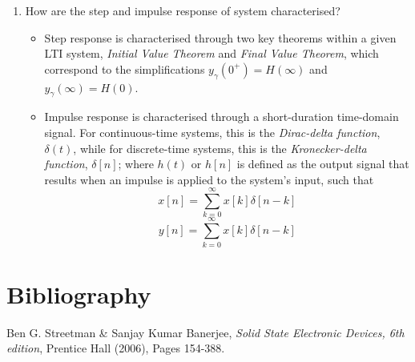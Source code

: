 \documentclass[12pt]{article}
\begin{document}
\begin{enumerate}
\item How are the step and impulse response of system characterised?
\begin{itemize}
\item Step response is characterised through two key theorems within a given LTI system, \emph{Initial Value Theorem} and \emph{Final Value Theorem}, which correspond to the simplifications $y_\gamma(0^+)=H(\infty)$ and $y_\gamma(\infty)=H(0)$.
\item Impulse response is characterised through a short-duration time-domain signal. For continuous-time systems, this is the \emph{Dirac-delta function}, $\delta(t)$, while for discrete-time systems, this is the \emph{Kronecker-delta function}, $\delta[n]$; where $h(t)$ or $h[n]$ is defined as the output signal that results when an impulse is applied to the system's input, such that
$$x[n]=\sum^{\infty}_{k=0}x[k]\delta[n-k]$$
$$y[n]=\sum^{\infty}_{k=0}x[k]\delta[n-k]$$
\end{itemize}
\end{enumerate}

\section{Bibliography}
\begin{thebibliography}{3}
  Ben G. Streetman \& Sanjay Kumar Banerjee,
  \emph{Solid State Electronic Devices, 6th edition},
  Prentice Hall (2006),
  Pages 154-388.
\end{thebibliography}
\end{document}
